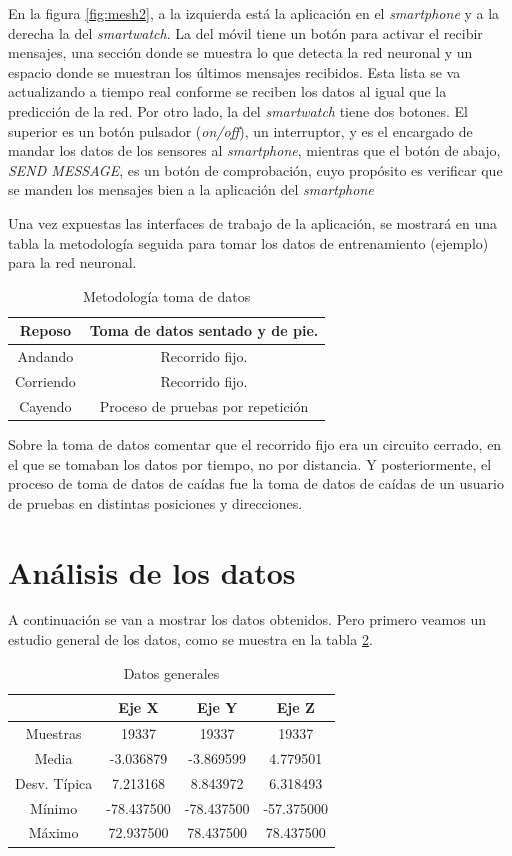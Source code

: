 \documentclass[12pt]{book}
\numberwithin{equation}{section}
\begin{document}
En la figura \ref{fig:mesh2}, a la izquierda está la aplicación en el \textit{smartphone} y a la derecha la del \textit{smartwatch}. La del móvil tiene un botón para activar el recibir mensajes, una sección donde se muestra lo que detecta la red neuronal y un espacio donde se muestran los últimos mensajes recibidos. Esta lista se va actualizando a tiempo real conforme se reciben los datos al igual que la predicción de la red. Por otro lado, la del \textit{smartwatch} tiene dos botones. El superior es un botón pulsador (\textit{on/off}), un interruptor, y es el encargado de mandar los datos de los sensores al \textit{smartphone}, mientras que el botón de abajo, \textit{SEND MESSAGE}, es un botón de comprobación, cuyo propósito es verificar que se manden los mensajes bien a la aplicación del \textit{smartphone}

Una vez expuestas las interfaces de trabajo de la aplicación, se mostrará en una tabla la metodología seguida para tomar los datos de entrenamiento (ejemplo) para la red neuronal.

\begin{table}[h]
\centering
\caption{Metodología toma de datos}
\begin{tabular}{| c | c |}
\hline
Reposo & Toma de datos sentado y de pie. \\
\hline
Andando & Recorrido fijo. \\
\hline
Corriendo & Recorrido fijo. \\
\hline
Cayendo & Proceso de pruebas por repetición \\
\hline
\end{tabular}
\label{tabla1}
\end{table}

Sobre la toma de datos comentar que el recorrido fijo era un circuito cerrado, en el que se tomaban los datos por tiempo, no por distancia. Y posteriormente, el proceso de toma de datos de caídas fue la toma de datos de caídas de un usuario de pruebas en distintas posiciones y direcciones.

\newpage
\section{Análisis de los datos}

A continuación se van a mostrar los datos obtenidos. Pero primero veamos un estudio general de los datos, como se muestra en la tabla \ref{tabla2}.
\begin{table}[h]
\centering
\caption{Datos generales}
\begin{tabular}{| c | c | c | c |}
\hline
 & Eje X & Eje Y & Eje Z \\
\hline
Muestras & 19337 & 19337 & 19337 \\
\hline
Media & -3.036879 & -3.869599 & 4.779501 \\
\hline
Desv. Típica & 7.213168 & 8.843972 & 6.318493 \\
\hline
Mínimo & -78.437500 & -78.437500 & -57.375000 \\
\hline
Máximo & 72.937500 & 78.437500 & 78.437500 \\
\hline
\end{tabular}
\label{tabla2}
\end{table}
\end{document}
